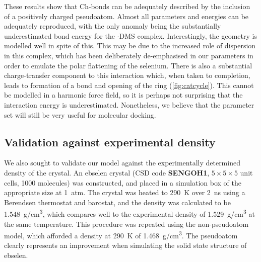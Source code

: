 \begin{refsection}
These results show that Ch-bonds can be adequately described by the inclusion of a positively charged pseudoatom.
Almost all parameters and energies can be adequately reproduced, with the only anomaly being the substantially underestimated bond energy for the $\cdot$DMS complex.
Interestingly, the geometry is modelled well in spite of this.
This may be due to the increased role of dispersion in this complex, which has been deliberately de-emphasised in our parameters in order to emulate the polar flattening of the selenium.
There is also a substantial charge-transfer component to this interaction which, when taken to completion, leads to formation of a  bond and opening of the ring (\cref{fig:catcycle}).
This cannot be modelled in a harmonic force field, so it is perhaps not surprising that the interaction energy is underestimated.
Nonetheless, we believe that the parameter set will still be very useful for molecular docking.

\subsection{Validation against experimental density}
We also sought to validate our model against the experimentally determined density of the crystal.
An ebselen crystal (CSD code \textbf{SENGOH1}, $5 \times 5 \times 5$ unit cells, 1000 molecules) was constructed, and placed in a simulation box of the appropriate size at 1~atm.
The crystal was heated to 290~K over 2~ns using a Berendsen thermostat and barostat, and the density was calculated to be 1.548~g/cm\textsuperscript{3}, which compares well to the experimental density of 1.529~g/cm\textsuperscript{3} at the same temperature.\autocite{Dupont1990StructuresII}
This procedure was repeated using the non-pseudoatom model, which afforded a density at 290~K of 1.468~g/cm\textsuperscript{3}.
The pseudoatom clearly represents an improvement when simulating the solid state structure of ebselen.


\end{refsection}
